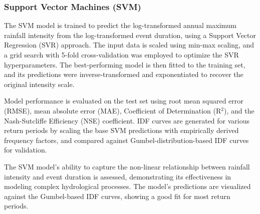 \subsubsection{Support Vector Machines (SVM)}
The SVM model is trained to predict the log-transformed annual maximum rainfall intensity from the log-transformed event duration, using a Support Vector Regression (SVR) approach. The input data is scaled using min-max scaling, and a grid search with 5-fold cross-validation was employed to optimize the SVR hyperparameters. The best-performing model is then fitted to the training set, and its predictions were inverse-transformed and exponentiated to recover the original intensity scale.

\vspace{1em}

Model performance is evaluated on the test set using root mean squared error (RMSE), mean absolute error (MAE), Coefficient of Determination (R$^{2}$), and the Nash-Sutcliffe Efficiency (NSE) coefficient. IDF curves are generated for various return periods by scaling the base SVM predictions with empirically derived frequency factors, and compared against Gumbel-distribution-based IDF curves for validation.

\vspace{1em}

The SVM model's ability to capture the non-linear relationship between rainfall intensity and event duration is assessed, demonstrating its effectiveness in modeling complex hydrological processes. The model's predictions are visualized against the Gumbel-based IDF curves, showing a good fit for most return periods.